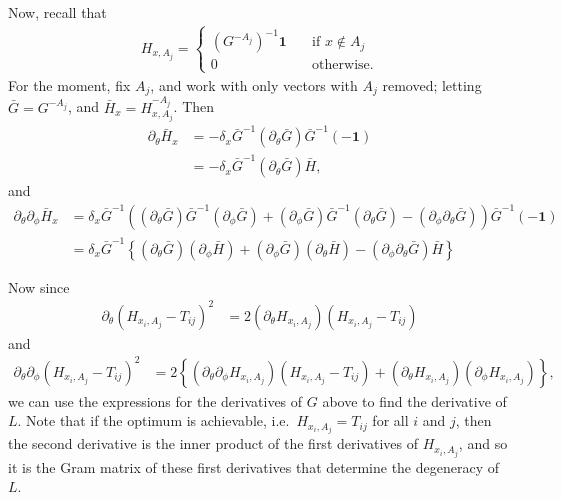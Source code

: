 \documentclass{article}
\newcommand{\bone}{\mathbf{1}}
\begin{document}
Now, recall that
\begin{align}
  H_{x,A_j} = \begin{cases}
    (G^{-A_j})^{-1} \bone \quad & \text{if } x \notin A_j \\
    0 \quad & \text{otherwise.}
  \end{cases}
\end{align}
For the moment, fix $A_j$, and work with only vectors with $A_j$ removed;
letting $\bar G = G^{-A_j}$, and $\bar H_x = H_{x,A_j}^{-A_j}$.
Then
\begin{align}
  \partial_\theta \bar H_x 
  &= - \delta_x \bar G^{-1} (\partial_\theta \bar G) \bar G^{-1} (-\bone) \\
  &= - \delta_x \bar G^{-1} (\partial_\theta \bar G) \bar H ,
\end{align}
and
\begin{align}
  \partial_\theta \partial_\phi \bar H_x 
    &= \delta_x \bar G^{-1} \left( 
    (\partial_\theta \bar G) \bar G^{-1} (\partial_\phi \bar G)
    + (\partial_\phi \bar G) \bar G^{-1} (\partial_\theta \bar G)
    - (\partial_\phi \partial_\theta \bar G)
    \right) \bar G^{-1} (-\bone) \\
    &= \delta_x \bar G^{-1} \left\{
    (\partial_\theta \bar G) ( \partial_\phi \bar H ) 
    + (\partial_\phi \bar G) ( \partial_\theta \bar H )
    - (\partial_\phi \partial_\theta \bar G) \bar H
    \right\}
\end{align}

Now since
\begin{align}
  \partial_\theta (H_{x_i,A_j} - T_{ij})^2 
    &= 2 ( \partial_\theta H_{x_i,A_j} )(H_{x_i,A_j} - T_{ij})
\end{align}
and
\begin{align}
  \partial_\theta \partial_\phi (H_{x_i,A_j} - T_{ij})^2 
    &= 2 \left\{
    ( \partial_\theta \partial_\phi H_{x_i,A_j} )(H_{x_i,A_j} - T_{ij})
    + ( \partial_\theta H_{x_i,A_j} ) ( \partial_\phi H_{x_i,A_j} ) \right\} ,
\end{align}
we can use the expressions for the derivatives of $G$ above to find the derivative of $L$.
Note that if the optimum is achievable, i.e.\ $H_{x_i,A_j} = T_{ij}$ for all $i$ and $j$, 
then the second derivative is the inner product of the first derivatives of $H_{x_i,A_j}$,
and so it is the Gram matrix of these first derivatives that determine the degeneracy of $L$.
\end{document}
